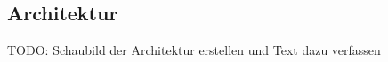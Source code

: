 \subsection{Architektur}
\label{subsec:architecture}

TODO: Schaubild der Architektur erstellen und Text dazu verfassen
